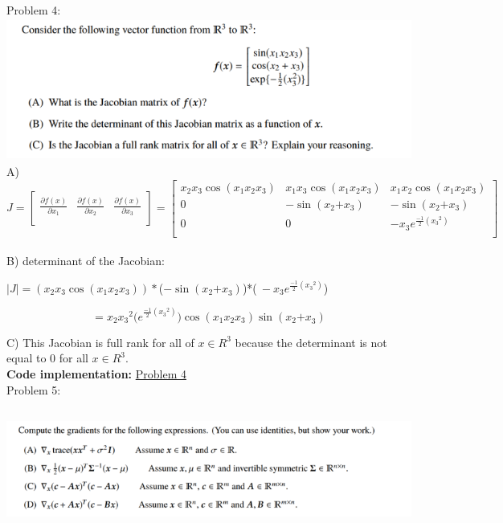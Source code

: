 \documentclass[
]{article}
\begin{document}
\newpage
Problem 4:\\
\includegraphics[width=6.49167in,height=1.84167in]{image5.png}\\
A)\\
\[J = \begin{bmatrix}
    \frac{\partial f(x)}{\partial x_{1}} & \frac{\partial f(x)}{\partial x_{2}} & \frac{\partial f(x)}{\partial x_{3}} \\
    \end{bmatrix} = \begin{bmatrix}
    x_{2}x_{3}\cos{(x_{1}x_{2}x_{3})} & x_{1}x_{3}\cos{(x_{1}x_{2}x_{3})} & x_{1}x_{2}\cos{(x_{1}x_{2}x_{3})} \\
    0 & - \sin{(x_{2}{+ x}_{3})} & - \sin{(x_{2}{+ x}_{3})} \\
    0 & 0 & - x_{3}e^{\frac{- 1}{2}({x_{3}}^{2})} \\
    \end{bmatrix}\]\\
    
    B) determinant of the Jacobian:
    
    \(\left| J \right| = \left( x_{2}x_{3}\cos\left( x_{1}x_{2}x_{3} \right) \right)*\)(\(- \sin{(x_{2}{+ x}_{3})}\))*(\(\  - x_{3}e^{\frac{- 1}{2}({x_{3}}^{2})}\))
    
    \[= x_{2}{x_{3}}^{2}{(e}^{\frac{- 1}{2}({x_{3}}^{2})})\cos\left( x_{1}x_{2}x_{3} \right)\sin{(x_{2}{+ x}_{3})}\]
    
   C)  This Jacobian is full rank for all of $x \in  R^{3} $ because the determinant is not equal to 0 for all $x \in R^{3}$.\\
   \textbf{Code implementation:} \href{https://colab.research.google.com/github/dtungpka/Applied-Mathematics-for-Artificial-Intelligence/blob/main/Assignment_3/Assignment%203.ipynb#scrollTo=Problem_4}{Problem 4}
\\ \newpage Problem 5:\\
\includegraphics[width=6.49167in,height=1.84167in]{image8.png}\\
\end{document}
